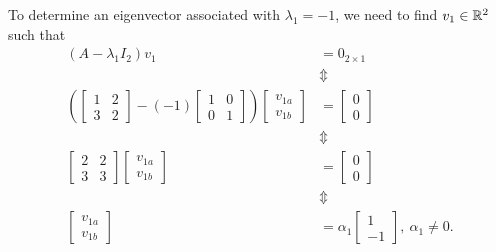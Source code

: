    To determine an eigenvector associated with $ \lambda_1=-1$, we need to find $v_1\in \mathbb R^2$ such that 
   \begin{align*}
       (A-\lambda_1 I_2) v_1 & = 0_{2 \times 1}\\
        & \Updownarrow \\
   \left( \left[\begin{array}{rr}
    1 & 2\\
    3 & 2
    \end{array}\right] - (-1)   \left[\begin{array}{rr}
    1 & 0\\
    0& 1
    \end{array}\right]\right) \left[\begin{array}{r}
   v_{1a} \\
  v_{1b}
    \end{array}\right] & = \left[\begin{array}{r}
   0 \\
  0
    \end{array}\right]\\
     & \Updownarrow \\
      \left[\begin{array}{rr}
    2 & 2\\
    3 & 3
    \end{array}\right]  \left[\begin{array}{r}
   v_{1a} \\
  v_{1b}
    \end{array}\right] & = \left[\begin{array}{r}
   0 \\
  0
    \end{array}\right]\\
    & \Updownarrow \\
   \left[\begin{array}{r}
   v_{1a} \\
  v_{1b}
    \end{array}\right] & = \alpha_1  \left[\begin{array}{r}
   1 \\
  -1
    \end{array}\right], ~\alpha_1 \neq 0.
   \end{align*}
  
